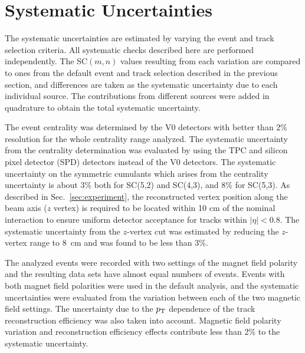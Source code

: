 \section{Systematic Uncertainties}
\label{sec:uncertainties}
The systematic uncertainties are estimated by varying the event and track selection criteria. All systematic checks described here are performed independently. 
The SC$(m,n)$ values resulting from each variation are compared to ones from the default event and track selection described in the previous section,
and differences are taken as the systematic uncertainty due to each individual source.
The contributions from different sources were added in quadrature to obtain the total systematic uncertainty.

The event centrality was determined by the V0 detectors \cite{Abbas:2013taa} with better than 2\%  resolution for the whole centrality range analyzed. The systematic uncertainty from the centrality determination was evaluated by using the TPC and silicon pixel detector (SPD) \cite{Dellacasa:1999kf} detectors instead of the V0 detectors. 
The systematic uncertainty on the symmetric cumulants which arises from the centrality uncertainty is about 3\% both for SC(5,2) and SC(4,3), and 8\% for  SC(5,3).
As described in Sec.~\ref{sec:experiment}, the reconstructed vertex position along the beam axis ($z$ vertex) is required to be located within 10 cm of the nominal interaction to ensure uniform detector acceptance for tracks within $|\eta|<0.8$. The systematic uncertainty from the $z$-vertex cut was estimated by reducing the $z$-vertex range to 8~cm and was found to be less than 3\%.  

The analyzed events were recorded with two settings of the magnet field polarity and the resulting data sets have almost equal numbers of events. Events with both magnet field polarities were used in the default analysis, and the systematic uncertainties were evaluated from the variation between each of the two magnetic field settings. 
The uncertainty due to the $p_{\rm T}$ dependence of the track reconstruction efficiency was also taken into account.
Magnetic field polarity variation and reconstruction efficiency effects contribute less than 2\% to the systematic uncertainty.

